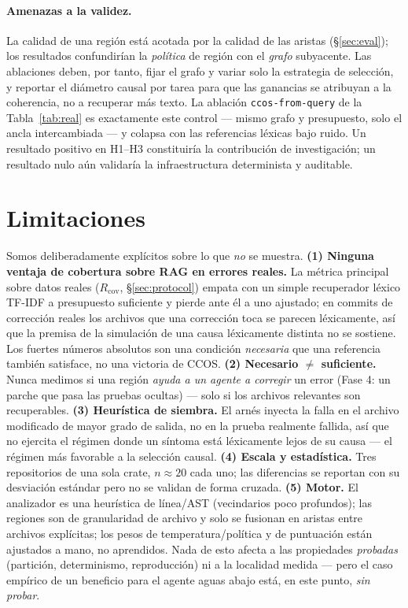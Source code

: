 \documentclass[11pt]{article}
\newcommand{\code}[1]{\texttt{#1}}
\begin{document}
\paragraph{Amenazas a la validez.} La calidad de una región está acotada por la calidad
de las aristas (\S\ref{sec:eval}); los resultados confundirían la \emph{política} de
región con el \emph{grafo} subyacente. Las ablaciones deben, por tanto, fijar el grafo y
variar solo la estrategia de selección, y reportar el diámetro causal por tarea para que
las ganancias se atribuyan a la coherencia, no a recuperar más texto. La ablación
\code{ccos-from-query} de la Tabla~\ref{tab:real} es exactamente este control --- mismo
grafo y presupuesto, solo el ancla intercambiada --- y colapsa con las referencias
léxicas bajo ruido. Un resultado positivo en H1--H3 constituiría la contribución de
investigación; un resultado nulo aún validaría la infraestructura determinista y
auditable.

\section{Limitaciones}

Somos deliberadamente explícitos sobre lo que \emph{no} se muestra.
\textbf{(1) Ninguna ventaja de cobertura sobre RAG en errores reales.} La métrica
principal sobre datos reales ($R_{\mathrm{cov}}$, \S\ref{sec:protocol}) empata con un
simple recuperador léxico TF-IDF a presupuesto suficiente y pierde ante él a uno
ajustado; en commits de corrección reales los archivos que una corrección toca se
parecen léxicamente, así que la premisa de la simulación de una causa léxicamente
distinta no se sostiene. Los fuertes números absolutos son una condición
\emph{necesaria} que una referencia también satisface, no una victoria de CCOS.
\textbf{(2) Necesario $\neq$ suficiente.} Nunca medimos si una región \emph{ayuda a un
agente a corregir} un error (Fase 4: un parche que pasa las pruebas ocultas) --- solo si
los archivos relevantes son recuperables.
\textbf{(3) Heurística de siembra.} El arnés inyecta la falla en el archivo modificado
de mayor grado de salida, no en la prueba realmente fallida, así que no ejercita el
régimen donde un síntoma está léxicamente lejos de su causa --- el régimen más favorable
a la selección causal.
\textbf{(4) Escala y estadística.} Tres repositorios de una sola crate,
$n\!\approx\!20$ cada uno; las diferencias se reportan con su desviación estándar pero no
se validan de forma cruzada.
\textbf{(5) Motor.} El analizador es una heurística de línea/AST (vecindarios poco
profundos); las regiones son de granularidad de archivo y solo se fusionan en aristas
entre archivos explícitas; los pesos de temperatura/política y de puntuación están
ajustados a mano, no aprendidos. Nada de esto afecta a las propiedades \emph{probadas}
(partición, determinismo, reproducción) ni a la localidad medida --- pero el caso
empírico de un beneficio para el agente aguas abajo está, en este punto, \emph{sin
probar}.
\end{document}
